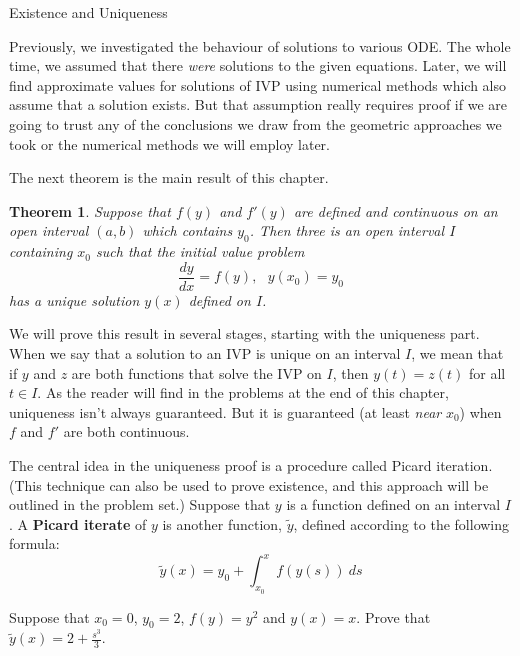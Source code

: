 \documentclass[12pt,letterpaper,twoside]{amsart}
\newcounter{example}
\newcounter{exercise}
\newcounter{problem}
\newtheorem{theorem}{Theorem}
\newcommand{\exercise}{\bigskip \noindent {\large {\sc Exercise \arabic{exercise}:}} \addtocounter{exercise}{1}}
\begin{document}
\sffamily

\begin{center} {\LARGE Existence and Uniqueness} \end{center}

\setcounter{example}{1}
\setcounter{exercise}{1}

Previously, we investigated the behaviour of solutions to various ODE.  The whole time, we assumed that there {\it were} solutions to the given equations.  Later, we will find approximate values for solutions of IVP using numerical methods which also assume that a solution exists.  But that assumption really requires proof if we are going to trust any of the conclusions we draw from the geometric approaches we took or the numerical methods we will employ later.  

The next theorem is the main result of this chapter.

\begin{theorem} Suppose that $f(y)$ and $f'(y)$ are defined and continuous on an open interval $(a,b)$ which contains $y_0$.  Then three is an open interval $I$ containing $x_0$ such that the initial value problem 
\[ \frac{dy}{dx}=f(y), \ \ \ y(x_0)=y_0\]
has a unique solution $y(x)$ defined on $I$.
\end{theorem}

We will prove this result in several stages, starting with the uniqueness part.  When we say that a solution to an IVP is unique on an interval $I$, we mean that if $y$ and $z$ are both functions that solve the IVP on $I$, then $y(t)=z(t)$ for all $t \in I$.  As the reader will find in the problems at the end of this chapter, uniqueness isn't always guaranteed.  But it is guaranteed (at least {\it near} $x_0$) when $f$ and $f'$ are both continuous.

The central idea in the uniqueness proof is a procedure called Picard iteration.  (This technique can also be used to prove existence, and this approach will be outlined in the problem set.)  Suppose that $y$ is a function defined on an interval $I$.  A {\bf Picard iterate} of $y$ is another function, $\tilde{y}$, defined according to the following formula:
\[ \tilde{y}(x) = y_0 + \int_{x_0}^x f(y(s)) \ ds\]

\exercise Suppose that $x_0=0$, $y_0=2$, $f(y)=y^2$ and $y(x)=x$.  Prove that $\tilde{y}(x)=2+\frac{s^3}{3}$.
\end{document}
